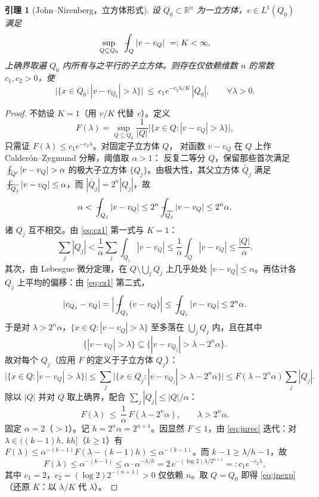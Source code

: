 \documentclass[11pt]{ctexart}
\newcommand{\fint}{\,\rlap{$-$}\!\int}
\newcommand{\R}{\mathbb{R}}
\theoremstyle{plain}
\newtheorem{lemma}{引理}
\theoremstyle{definition}
\begin{document}
\begin{lemma}[John--Nirenberg，立方体形式]\label{lem:jn}
设 $Q_0\subset\R^n$ 为一立方体，$v\in L^1(Q_0)$ 满足
\begin{equation}\label{eq:bmo}
\sup_{Q\subseteq Q_0}\ \fint_Q|v-v_Q|\ =:K<\infty,
\end{equation}
上确界取遍 $Q_0$ 内所有与之平行的子立方体。则存在仅依赖维数 $n$ 的常数
$c_1,c_2>0$，使
\begin{equation}\label{eq:jnexp}
\big|\{x\in Q_0:|v-v_{Q_0}|>\lambda\}\big|
\ \le\ c_1 e^{-c_2\lambda/K}\,|Q_0|,\qquad\forall\lambda>0.
\end{equation}
\end{lemma}

\begin{proof}
不妨设 $K=1$（用 $v/K$ 代替 $v$）。定义
\[
F(\lambda)=\sup_{Q\subseteq Q_0}\frac{1}{|Q|}
\big|\{x\in Q:|v-v_Q|>\lambda\}\big|,
\]
只需证 $F(\lambda)\le c_1e^{-c_2\lambda}$。对固定子立方体 $Q$，
对函数 $v-v_Q$ 在 $Q$ 上作 Calderón--Zygmund 分解，阈值取 $\alpha>1$：
反复二等分 $Q$，保留那些首次满足
$\fint_{Q'}|v-v_Q|>\alpha$ 的极大子立方体 $\{Q_j\}$。由极大性，其父立方体
$\widetilde{Q_j}$ 满足 $\fint_{\widetilde{Q_j}}|v-v_Q|\le\alpha$，而
$|\widetilde{Q_j}|=2^n|Q_j|$，故
\begin{equation}\label{eq:cz1}
\alpha<\fint_{Q_j}|v-v_Q|\le2^n\fint_{\widetilde{Q_j}}|v-v_Q|\le2^n\alpha.
\end{equation}
诸 $Q_j$ 互不相交。由 \eqref{eq:cz1} 第一式与 $K=1$：
\[
\sum_j|Q_j|<\frac1\alpha\sum_j\int_{Q_j}|v-v_Q|
\le\frac1\alpha\int_Q|v-v_Q|\le\frac{|Q|}\alpha .
\]
其次，由 Lebesgue 微分定理，在 $Q\setminus\bigcup_jQ_j$ 上几乎处处
$|v-v_Q|\le\alpha$。再估计各 $Q_j$ 上平均的偏移：由 \eqref{eq:cz1} 第二式，
\[
|v_{Q_j}-v_Q|=\Big|\fint_{Q_j}(v-v_Q)\Big|\le\fint_{Q_j}|v-v_Q|\le2^n\alpha.
\]
于是对 $\lambda>2^n\alpha$，$\{x\in Q:|v-v_Q|>\lambda\}$ 至多落在
$\bigcup_jQ_j$ 内，且在其中
\[
\{|v-v_Q|>\lambda\}\subseteq\{|v-v_{Q_j}|>\lambda-2^n\alpha\}.
\]
故对每个 $Q_j$（应用 $F$ 的定义于子立方体 $Q_j$）：
\[
\big|\{x\in Q:|v-v_Q|>\lambda\}\big|
\le\sum_j\big|\{x\in Q_j:|v-v_{Q_j}|>\lambda-2^n\alpha\}\big|
\le F(\lambda-2^n\alpha)\sum_j|Q_j|.
\]
除以 $|Q|$ 并对 $Q$ 取上确界，配合 $\sum_j|Q_j|\le|Q|/\alpha$：
\begin{equation}\label{eq:jnrec}
F(\lambda)\ \le\ \frac1\alpha\,F(\lambda-2^n\alpha),\qquad\lambda>2^n\alpha.
\end{equation}
固定 $\alpha=2$（$>1$）。记 $h=2^n\alpha=2^{n+1}$。因显然 $F\le1$，由
\eqref{eq:jnrec} 迭代：对 $\lambda\in\big((k-1)h,\,kh\big]$（$k\ge1$）有
$F(\lambda)\le\alpha^{-(k-1)}F(\lambda-(k-1)h)\le\alpha^{-(k-1)}$。而
$k-1\ge\lambda/h-1$，故
\[
F(\lambda)\le\alpha^{-(k-1)}\le\alpha\cdot\alpha^{-\lambda/h}
=2\,e^{-(\log2)\lambda/2^{n+1}}=:c_1e^{-c_2\lambda},
\]
其中 $c_1=2$，$c_2=(\log2)2^{-(n+1)}>0$ 仅依赖 $n$。取 $Q=Q_0$ 即得
\eqref{eq:jnexp}（还原 $K$：以 $\lambda/K$ 代 $\lambda$）。
\end{proof}
\end{document}
